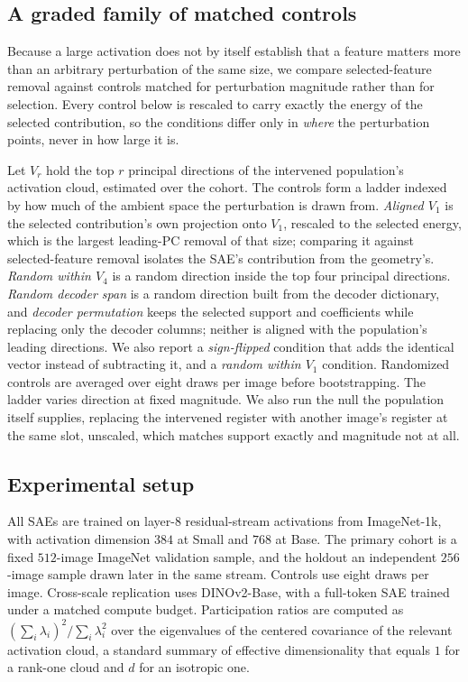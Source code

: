 \documentclass{article}
\begin{document}
\subsection{A graded family of matched controls}
\label{sec:controls}

Because a large activation does not by itself establish that a feature matters more than an arbitrary perturbation of the same size, we compare selected-feature removal against controls matched for perturbation magnitude rather than for selection. Every control below is rescaled to carry exactly the energy of the selected contribution, so the conditions differ only in \emph{where} the perturbation points, never in how large it is.

Let $V_r$ hold the top $r$ principal directions of the intervened population's activation cloud, estimated over the cohort. The controls form a ladder indexed by how much of the ambient space the perturbation is drawn from. \emph{Aligned $V_1$} is the selected contribution's own projection onto $V_1$, rescaled to the selected energy, which is the largest leading-PC removal of that size; comparing it against selected-feature removal isolates the SAE's contribution from the geometry's. \emph{Random within $V_4$} is a random direction inside the top four principal directions. \emph{Random decoder span} is a random direction built from the decoder dictionary, and \emph{decoder permutation} keeps the selected support and coefficients while replacing only the decoder columns; neither is aligned with the population's leading directions. We also report a \emph{sign-flipped} condition that adds the identical vector instead of subtracting it, and a \emph{random within $V_1$} condition. Randomized controls are averaged over eight draws per image before bootstrapping. The ladder varies direction at fixed magnitude. We also run the null the population itself supplies, replacing the intervened register with another image's register at the same slot, unscaled, which matches support exactly and magnitude not at all.

\subsection{Experimental setup}
\label{sec:setup}

All SAEs are trained on layer-8 residual-stream activations from ImageNet-1k, with activation dimension $384$ at Small and $768$ at Base. The primary cohort is a fixed $512$-image ImageNet validation sample, and the holdout an independent $256$-image sample drawn later in the same stream. Controls use eight draws per image. Cross-scale replication uses DINOv2-Base, with a full-token SAE trained under a matched compute budget. Participation ratios are computed as $(\sum_i \lambda_i)^2 / \sum_i \lambda_i^2$ over the eigenvalues of the centered covariance of the relevant activation cloud, a standard summary of effective dimensionality that equals $1$ for a rank-one cloud and $d$ for an isotropic one.
\end{document}

